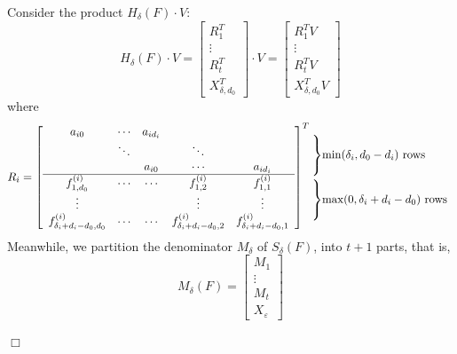 \documentclass{article}
\newenvironment{proof}{\noindent{\em Proof:}}{$\Box$~\\}
\begin{document}
\begin{proof}
Consider the product $H_\delta (F) \cdot V$:
$$H_\delta (F) \cdot V=\begin{bmatrix}
R_1^T\\\vdots\\[3pt]R_t^T\\[3pt]X_{\delta ,{d_0}}^T
\end{bmatrix}\cdot V=\begin{bmatrix}
R_1^TV\\\vdots\\[3pt]R_t^T V\\[3pt]X_{\delta ,{d_0}} ^TV
\end{bmatrix}$$
where
\[R_i= {\left[ {\begin{array}{*{20}{c}}
a_{i0}&\cdots &{{a_{i{d_i}}}}&{}&{}\\
&\ddots &{}& \ddots &{}\\
&&{{a_{i0}}}& \cdots &{{a_{i{d_i}}}}\\
\hline
{f_{1,{d_0}}^{(i)}}& \cdots & \cdots &{f_{1,2}^{(i)}}&{f_{1,1}^{(i)}}\\
 \vdots & & &\vdots & \vdots \\
{f_{{\delta _i} + {d_i} - {d_0},{d_0}}^{(i)}}& \cdots& \cdots  &{f_{{\delta _i} + {d_i} - {d_0},2}^{(i)}}&{f_{{\delta _i} + {d_i} - {d_0},1}^{(i)}}
\end{array}} \right]^T}
\hspace{-1.4em}\begin{array}{*{20}{l}}
{\left. {\begin{array}{*{20}{c}}
{}\\
{}\\
{}
\end{array}} \right\}}{\min ({\delta _i},{d_0} - {d_i})} \text{~rows}\\[15pt]
{\left. {\begin{array}{*{20}{c}}
{}\\
{}\\
{}
\end{array}} \right\}}{\max (0,{\delta _i} + {d_i} - {d_0})}\text{~rows}
\end{array}\]
Meanwhile, we partition the denominator $M_{\delta}$ of $S_\delta (F)$, into $t+1$ parts, that is,
\begin{equation}\label{eq:partition_of_M}
M_\delta (F)=\begin{bmatrix}
M_1\\
\vdots\\
M_t\\
X_{\varepsilon}
\end{bmatrix}
\end{equation}

\end{proof}
\end{document}
